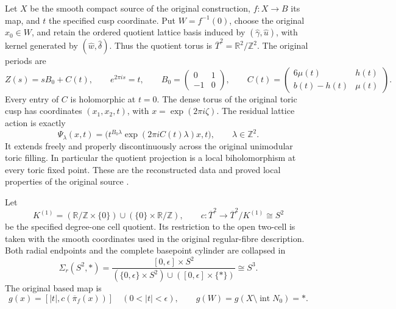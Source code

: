 \documentclass[11pt,letterpaper]{article}
\numberwithin{equation}{section}
\theoremstyle{definition}
\theoremstyle{remark}
\begin{document}
Let \(X\) be the smooth compact source of the original construction,
\(f:X\to B\) its map, and \(t\) the specified cusp coordinate.
Put \(W=f^{-1}(0)\), choose the original \(x_0\in W\), and retain the
ordered quotient lattice basis induced by
\((\widehat\gamma,\widehat u)\), with kernel generated by
\((\widehat w,\widehat\delta)\). Thus the quotient torus is
\(\overline T^2=\mathbb R^2/\mathbb Z^2\). The original periods are
\begin{equation}
 Z(s)=sB_0+C(t),\qquad e^{2\pi i s}=t,\qquad
 B_0=\begin{pmatrix}0&1\\-1&0\end{pmatrix},\qquad
 C(t)=\begin{pmatrix}6\mu(t)&h(t)\\b(t)-h(t)&\mu(t)\end{pmatrix}.
 \label{cone-cusp-null:eq:periods}
\end{equation}
Every entry of \(C\) is holomorphic at \(t=0\).
The dense torus of the original toric cusp has coordinates
\((x_1,x_2,t)\), with
\(x=\exp(2\pi i\zeta)\). The residual lattice action is exactly
\begin{equation}
 \Psi_\lambda(x,t)=
 \bigl(t^{B_0\lambda}\exp(2\pi iC(t)\lambda)x,t\bigr),
 \qquad\lambda\in\mathbb Z^2.
 \label{cone-cusp-null:eq:action}
\end{equation}
It extends freely and properly discontinuously across the original
unimodular toric filling. In particular the quotient projection is a local
biholomorphism at every toric fixed point. These are the reconstructed
data and proved local properties of the original source
\cite[\S4, source pp.~24--29]{AlpogeS6_2026}.

Let
\[
 K^{(1)}=(\mathbb R/\mathbb Z\times\{0\})\cup(\{0\}\times\mathbb R/\mathbb Z),\qquad
 c:\overline T^2\longrightarrow \overline T^2/K^{(1)}\cong S^2
\]
be the specified degree-one cell quotient. Its restriction to the open
two-cell is taken with the smooth coordinates used in the original
regular-fibre description. Both radial endpoints and the complete
basepoint cylinder are collapsed in
\[
 \Sigma_r(S^2,*)=
 \frac{[0,\epsilon]\times S^2}
 {(\{0,\epsilon\}\times S^2)\cup([0,\epsilon]\times\{*\})}
 \cong S^3.
\]
The original based map is
\begin{equation}
 g(x)=[|t|,c(\overline\pi_f(x))]\quad(0<|t|<\epsilon),\qquad
 g(W)=g(X\setminus\operatorname{int}N_0)=*.
 \label{cone-cusp-null:eq:g}
\end{equation}
\end{document}
